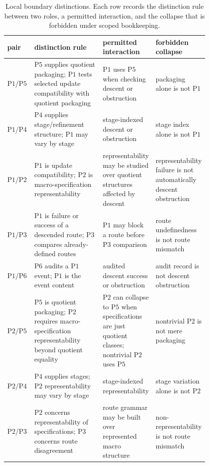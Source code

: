 \documentclass[11pt]{article}
\theoremstyle{definition}
\newcommand{\Pone}{\ensuremath{\mathrm{P1}}}
\newcommand{\Ptwo}{\ensuremath{\mathrm{P2}}}
\newcommand{\Pthree}{\ensuremath{\mathrm{P3}}}
\newcommand{\Pfour}{\ensuremath{\mathrm{P4}}}
\newcommand{\Pfive}{\ensuremath{\mathrm{P5}}}
\newcommand{\Psix}{\ensuremath{\mathrm{P6}}}
\begin{document}
\begin{landscape}
\begin{table}
\caption{Local boundary distinctions. Each row records the distinction
rule between two roles, a permitted interaction, and the collapse that
is forbidden under scoped bookkeeping.}
\label{tab:boundary-matrix}
\centering
\footnotesize
\renewcommand{\arraystretch}{1.15}
\begin{tabular}{@{}lp{0.34\linewidth}p{0.24\linewidth}p{0.24\linewidth}@{}}
\toprule
pair & distinction rule & permitted interaction & forbidden collapse \\
\midrule
\Pone{}/\Pfive{} & \Pfive{} supplies quotient packaging; \Pone{} tests selected update compatibility with quotient packaging & \Pone{} uses \Pfive{} when checking descent or obstruction & packaging alone is not \Pone{} \\
\Pone{}/\Pfour{} & \Pfour{} supplies stage/refinement structure; \Pone{} may vary by stage & stage-indexed descent or obstruction & stage index alone is not \Pone{} \\
\Pone{}/\Ptwo{} & \Pone{} is update compatibility; \Ptwo{} is macro-specification representability & representability may be studied over quotient structures affected by descent & representability failure is not automatically descent obstruction \\
\Pone{}/\Pthree{} & \Pone{} is failure or success of a descended route; \Pthree{} compares already-defined routes & \Pone{} may block a route before \Pthree{} comparison & route undefinedness is not route mismatch \\
\Pone{}/\Psix{} & \Psix{} audits a \Pone{} event; \Pone{} is the event content & audited descent success or obstruction & audit record is not descent obstruction \\
\Ptwo{}/\Pfive{} & \Pfive{} is quotient packaging; \Ptwo{} requires macro-specification representability beyond quotient equality & \Ptwo{} can collapse to \Pfive{} when specifications are just quotient classes; nontrivial \Ptwo{} uses \Pfive{} & nontrivial \Ptwo{} is not mere packaging \\
\Ptwo{}/\Pfour{} & \Pfour{} supplies stages; \Ptwo{} representability may vary by stage & stage-indexed representability & stage variation alone is not \Ptwo{} \\
\Ptwo{}/\Pthree{} & \Ptwo{} concerns representability of specifications; \Pthree{} concerns route disagreement & route grammar may be built over represented macro structure & non-representability is not route mismatch \\

\end{tabular}
\end{table}
\end{landscape}
\end{document}
